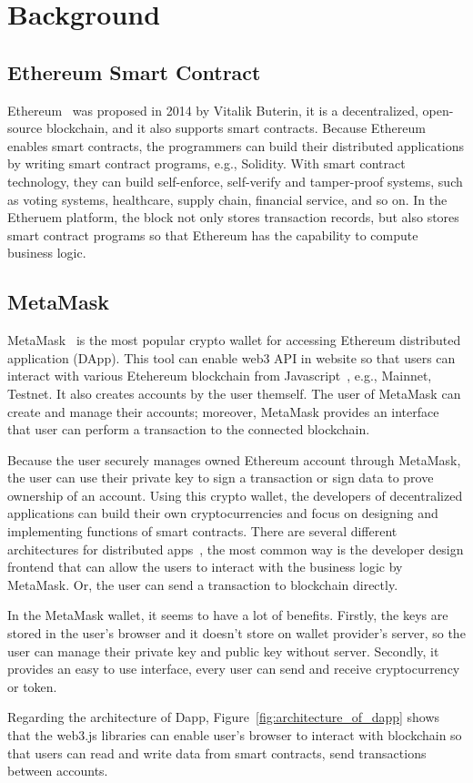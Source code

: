 \chapter{Background}
\label{chapter:background}

\section{Ethereum Smart Contract}
Ethereum~\cite{buterin2014next} was proposed in 2014 by Vitalik Buterin, it is a decentralized, open-source blockchain, and it also supports smart contracts. Because Ethereum enables smart contracts, the programmers can build their distributed applications by writing smart contract programs, e.g., Solidity. With smart contract technology, they can build self-enforce, self-verify and tamper-proof systems, such as voting systems, healthcare, supply chain, financial service, and so on. In the Etheruem platform, the block not only stores transaction records, but also stores smart contract programs so that Ethereum has the capability to compute business logic.

\newpage
\section{MetaMask}
MetaMask~\cite{metamask} is the most popular crypto wallet for accessing Ethereum distributed application (DApp). This tool can enable web3 API in website so that users can interact with various Etehereum blockchain from Javascript~\cite{web3.js}, e.g., Mainnet, Testnet. It also creates accounts by the user themself. The user of MetaMask can create and manage their accounts; moreover, MetaMask provides an interface that user can perform a transaction to the connected blockchain.\par
Because the user securely manages owned Ethereum account through MetaMask, the user can use their private key to sign a transaction or sign data to prove ownership of an account. Using this crypto wallet, the developers of decentralized applications can build their own cryptocurrencies and focus on designing and implementing functions of smart contracts. There are several different architectures for distributed apps~\cite{wessling2018engineering}, the most common way is the developer design frontend that can allow the users to interact with the business logic by MetaMask. Or, the user can send a transaction to blockchain directly.\par
In the MetaMask wallet, it seems to have a lot of benefits. Firstly, the keys are stored in the user's browser and it doesn't store on wallet provider's server, so the user can manage their private key and public key without server. Secondly, it provides an easy to use interface, every user can send and receive cryptocurrency or token.\par
Regarding the architecture of Dapp, Figure~\ref{fig:architecture_of_dapp} shows that the web3.js libraries can enable user's browser to interact with blockchain so that users can read and write data from smart contracts, send transactions between accounts. 


